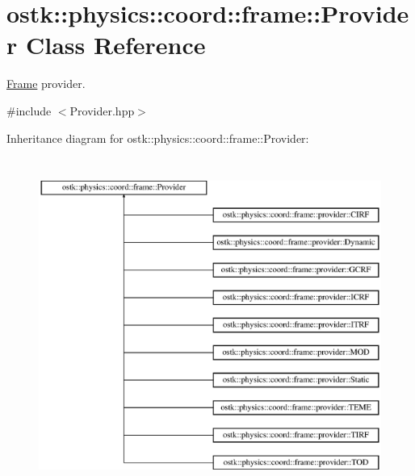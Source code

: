 \hypertarget{classostk_1_1physics_1_1coord_1_1frame_1_1_provider}{}\section{ostk\+:\+:physics\+:\+:coord\+:\+:frame\+:\+:Provider Class Reference}
\label{classostk_1_1physics_1_1coord_1_1frame_1_1_provider}


\hyperlink{classostk_1_1physics_1_1coord_1_1_frame}{Frame} provider.  




{\ttfamily \#include $<$Provider.\+hpp$>$}

Inheritance diagram for ostk\+:\+:physics\+:\+:coord\+:\+:frame\+:\+:Provider\+:\begin{figure}[H]
\begin{center}
\leavevmode
\includegraphics[height=11.000000cm]{classostk_1_1physics_1_1coord_1_1frame_1_1_provider}
\end{center}
\end{figure}
